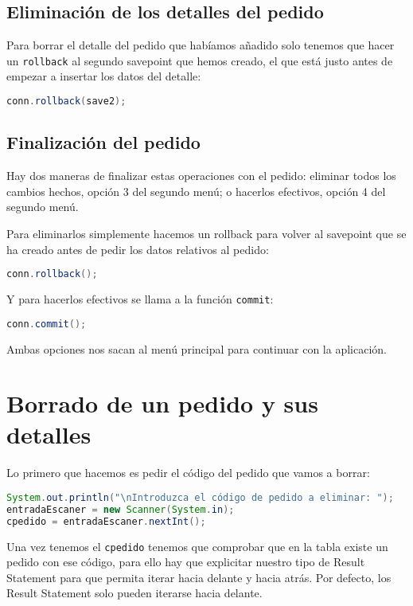 \pagebreak
\subsection{Eliminación de los detalles del pedido}

Para borrar el detalle del pedido que habíamos añadido solo tenemos que hacer un \texttt{rollback} al segundo savepoint que hemos creado, el que está justo antes de empezar a insertar los datos del detalle:

\begin{lstlisting}[language=Java]
conn.rollback(save2);
\end{lstlisting}

\subsection{Finalización del pedido}

Hay dos maneras de finalizar estas operaciones con el pedido: eliminar todos los cambios hechos, opción 3 del segundo menú; o hacerlos efectivos, opción 4 del segundo menú.

Para eliminarlos simplemente hacemos un rollback para volver al savepoint que se ha creado antes de pedir los datos relativos al pedido:
\begin{lstlisting}[language=Java]
conn.rollback();
\end{lstlisting}

Y para hacerlos efectivos se llama a la función \texttt{commit}:

\begin{lstlisting}[language=Java]
conn.commit();
\end{lstlisting}

Ambas opciones nos sacan al menú principal para continuar con la aplicación.

\section{Borrado de un pedido y sus detalles}

Lo primero que hacemos es pedir el código del pedido que vamos a borrar:

\begin{lstlisting}[language=Java]
System.out.println("\nIntroduzca el código de pedido a eliminar: ");
entradaEscaner = new Scanner(System.in);
cpedido = entradaEscaner.nextInt();
\end{lstlisting}

Una vez tenemos el \texttt{cpedido} tenemos que comprobar que en la tabla existe un pedido con ese código, para ello hay que explicitar nuestro tipo de Result Statement para que permita iterar hacia delante y hacia atrás. Por defecto, los Result Statement solo pueden iterarse hacia delante.

